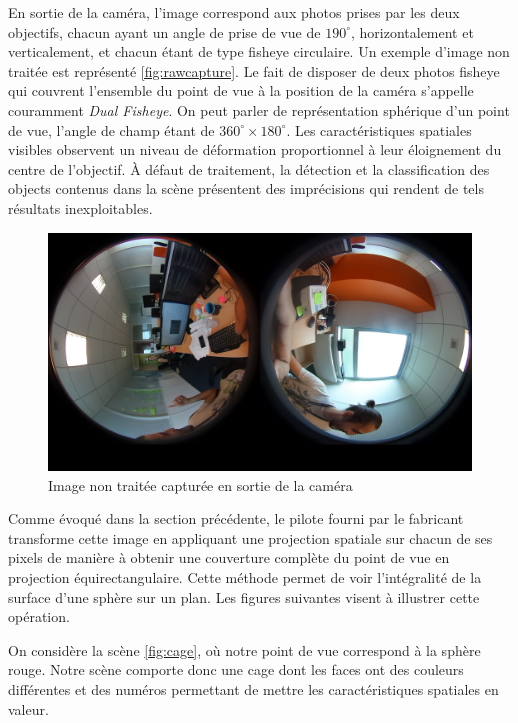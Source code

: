 			En sortie de la caméra, l'image correspond aux photos prises par les deux objectifs, chacun ayant un angle de prise de vue de $190^{\circ}$, horizontalement et verticalement, et chacun étant de type \gls{fisheye} circulaire. Un exemple d'image non traitée est représenté \autoref{fig:rawcapture}. Le fait de disposer de deux photos \gls{fisheye} qui couvrent l'ensemble du point de vue à la position de la caméra s'appelle couramment \emph{Dual Fisheye}. On peut parler de représentation sphérique d'un point de vue, l'angle de champ étant de $360^{\circ}\times180^{\circ}$. Les caractéristiques spatiales visibles observent un niveau de déformation proportionnel à leur éloignement du centre de l'objectif. À défaut de traitement, la détection et la classification des objects contenus dans la scène présentent des imprécisions qui rendent de tels résultats inexploitables.
			\begin{figure}[h]
			{
				\centering
				\includegraphics[width=1\textwidth]{figures/capture.jpg}
				\caption{Image non traitée capturée en sortie de la caméra}
				\label{fig:rawcapture}
			}
			\end{figure}
			\par
			Comme évoqué dans la section précédente, le pilote fourni par le fabricant transforme cette image en appliquant une projection spatiale sur chacun de ses pixels de manière à obtenir une couverture complète du point de vue en projection équirectangulaire. Cette méthode permet de voir l'intégralité de la surface d'une sphère sur un plan. Les figures suivantes visent à illustrer cette opération.
			\par
			On considère la scène \autoref{fig:cage}, où notre point de vue correspond à la sphère rouge. Notre scène comporte donc une cage dont les faces ont des couleurs différentes et des numéros permettant de mettre les caractéristiques spatiales en valeur.
